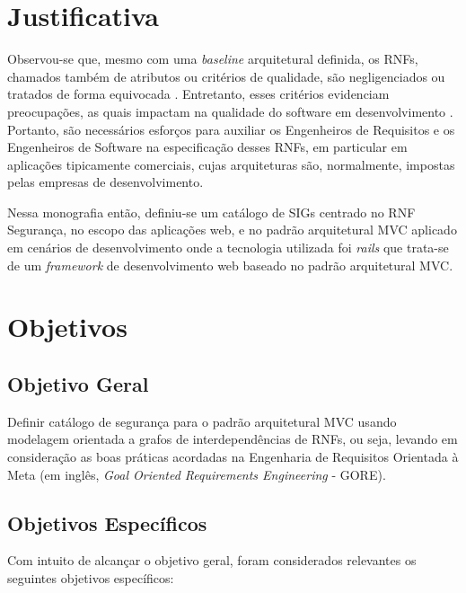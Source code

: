 \section{Justificativa}


Observou-se que, mesmo com uma \textit{baseline}  arquitetural definida, os RNFs, chamados também de atributos ou critérios de qualidade, são negligenciados ou tratados de forma equivocada \cite{eckhardt2016non}. Entretanto, esses critérios evidenciam preocupações, as quais impactam na qualidade do software em desenvolvimento \cite{schneidewind1990standard}.  
Portanto, são necessários esforços para auxiliar os Engenheiros de Requisitos e os Engenheiros de Software na especificação desses RNFs, em particular em aplicações tipicamente comerciais, cujas arquiteturas são, normalmente, impostas pelas empresas de desenvolvimento.

Nessa monografia então, definiu-se um catálogo de SIGs centrado no RNF Segurança, no escopo das aplicações web, e no padrão arquitetural MVC aplicado em cenários de desenvolvimento onde a tecnologia utilizada foi \textit{rails} que trata-se de um \textit{framework} de desenvolvimento web baseado no padrão arquitetural MVC. 

\section{Objetivos}
 
\subsection{Objetivo Geral}

Definir catálogo de segurança para o padrão arquitetural MVC usando modelagem orientada a grafos de interdependências de RNFs, ou seja, levando em consideração as boas práticas acordadas na Engenharia de Requisitos Orientada à Meta (em inglês, \textit{Goal Oriented Requirements Engineering} - GORE). 

\subsection{Objetivos Específicos}

Com intuito de alcançar o objetivo geral, foram considerados relevantes os seguintes objetivos específicos:

